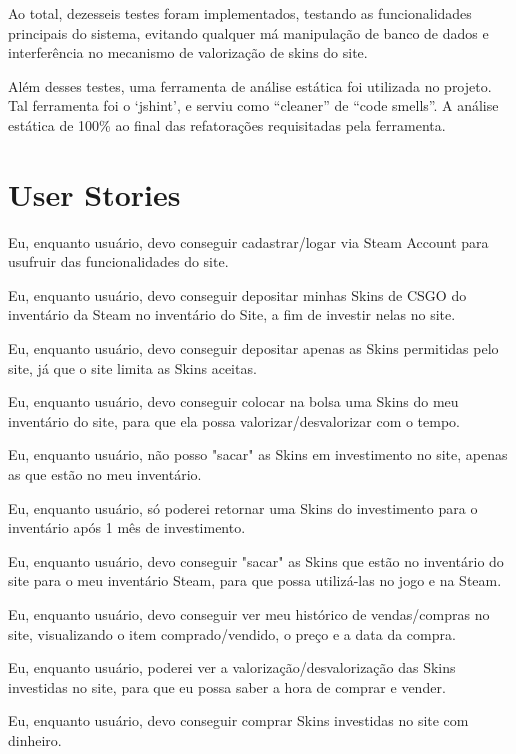     Ao total, dezesseis testes foram implementados, testando as funcionalidades principais do sistema, 
    evitando qualquer má manipulação de banco de dados e interferência no mecanismo de valorização de
     skins do site.
    
    Além desses testes, uma ferramenta de análise estática foi utilizada no projeto. Tal ferramenta 
    foi o ‘jshint’, e serviu como “cleaner” de “code smells”. A análise estática de 100\% ao final 
    das refatorações requisitadas pela ferramenta.

    \section{User Stories}
    Eu, enquanto usuário, devo conseguir cadastrar/logar via Steam Account para usufruir das 
    funcionalidades do site.

    Eu, enquanto usuário, devo conseguir depositar minhas Skins de CSGO do inventário da Steam no 
    inventário do Site, a fim de investir nelas no site.

    Eu, enquanto usuário, devo conseguir depositar apenas as Skins permitidas pelo site, já que o 
    site limita as Skins aceitas.

    Eu, enquanto usuário, devo conseguir colocar na bolsa uma Skins do meu inventário do site, para 
    que ela possa valorizar/desvalorizar com o tempo.

    Eu, enquanto usuário, não posso "sacar" as Skins em investimento no site, apenas as que estão no 
    meu inventário.

    Eu, enquanto usuário, só poderei retornar uma Skins do investimento para o inventário após 1 mês 
    de investimento.

    Eu, enquanto usuário, devo conseguir "sacar" as Skins que estão no inventário do site para o meu 
    inventário Steam, para que possa utilizá-las no jogo e na Steam.

    Eu, enquanto usuário, devo conseguir ver meu histórico de vendas/compras no site, visualizando o 
    item comprado/vendido, o preço e a data da compra.

    Eu, enquanto usuário, poderei ver a valorização/desvalorização das Skins investidas no site, para 
    que eu possa saber a hora de comprar e vender.

    Eu, enquanto usuário, devo conseguir comprar Skins investidas no site com dinheiro.

